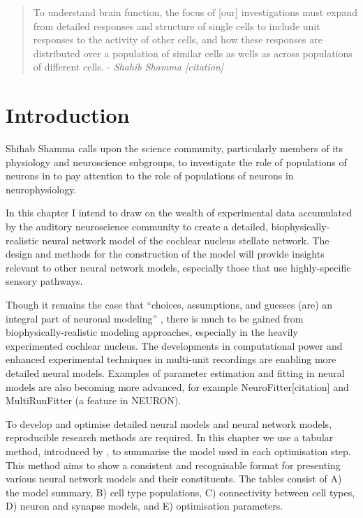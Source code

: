  

\begin{quotation}
  To understand brain function, the focus of [our] investigations must
  expand from detailed responses and structure of single cells to
  include unit responses to the activity of other cells, and how these
  responses are distributed over a population of similar cells as
  wells as across populations of different cells.  - \emph{Shahib Shamma [citation]}
\citet{Shamma:1998}
\end{quotation}


\section{Introduction}

Shihab Shamma calls upon the science community, particularly members
of its physiology and neuroscience subgroups, to investigate the role
of populations of neurons in to pay attention to the role of
populations of neurons in neurophysiology.

In this chapter I intend to draw on the wealth of experimental data
accumulated by the auditory neuroscience community to create a
detailed, biophysically-realistic neural network model of the cochlear
nucleus stellate network.  The design and methods for the construction
of the model will provide insights relevant to other neural network
models, especially those that use highly-specific sensory pathways.

Though it remains the case that ``choices, assumptions, and guesses
(are) an integral part of neuronal modeling''
\citep{SegevBurkeEtAl:1998}, there is much to be gained from
biophysically-realistic modeling approaches, especially in the heavily
experimented cochlear nucleus. The developments in computational power
and enhanced experimental techniques in multi-unit recordings are
enabling more detailed neural models. Examples of parameter estimation
and fitting in neural models are also becoming more advanced, for
example NeuroFitter[citation] and MultiRunFitter (a feature in
NEURON).  

\medskip{}

  To develop and optimise detailed neural models and
neural network models, reproducible research methods are required. In
this chapter we use a tabular method, introduced by
\citet{NordlieGewaltigEtAl:2009}, to summarise the model used in each
optimisation step. This method aims to show a consistent and
recognisable format for presenting various neural network models and
their constituents.  The tables consist of A) the model summary, B)
cell type populations, C) connectivity between cell types, D) neuron
and synapse models, and E) optimisation parameters.

